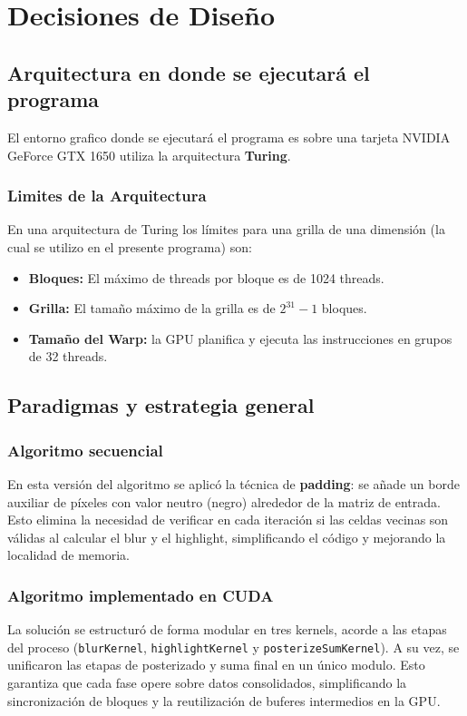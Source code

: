\chapter{Decisiones de Diseño}

\section{Arquitectura en donde se ejecutará el programa}

El entorno grafico donde se ejecutará el programa es sobre una tarjeta NVIDIA GeForce GTX 1650 utiliza la arquitectura \textbf{Turing}.

\subsection*{Limites de la Arquitectura}

En una arquitectura de Turing los límites para una grilla de una dimensión (la cual se utilizo en el presente programa) son:

\begin{itemize}
  \item \textbf{Bloques:} El máximo de threads por bloque es de 1024 threads.
  \item \textbf{Grilla:}  El tamaño máximo de la grilla es de $2^{31} - 1$ bloques.
  \item \textbf{Tamaño del Warp:} la GPU planifica y ejecuta las instrucciones en grupos de 32 threads.
\end{itemize}

\section{Paradigmas y estrategia general}

\subsection*{Algoritmo secuencial}
 
En esta versión del algoritmo se aplicó la técnica de \textbf{padding}: se añade un
borde auxiliar de píxeles con valor neutro (negro) alrededor de la matriz de entrada. Esto
elimina la necesidad de verificar en cada iteración si las celdas vecinas son válidas al
calcular el blur y el highlight, simplificando el código y mejorando la localidad de memoria.
 
\subsection*{Algoritmo implementado en CUDA}
La solución se estructuró de forma modular en tres kernels, acorde a las etapas del proceso (\texttt{blurKernel}, \texttt{highlightKernel} y \texttt{posterizeSumKernel}). A su vez, se unificaron las etapas de posterizado y suma final en un único modulo. Esto garantiza que cada fase opere sobre datos consolidados, simplificando la sincronización de bloques y la reutilización de buferes intermedios en la GPU.


